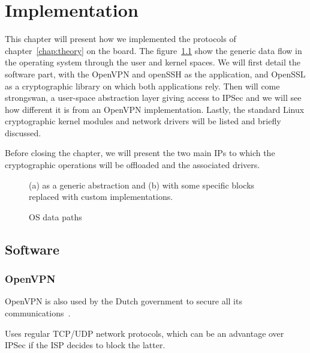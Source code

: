 \chapter{Implementation}
This chapter will present how we implemented the protocols of chapter~\ref{chap:theory} on the board.
The figure~\ref{fig:os-path-generic} show the generic data flow in the operating system through the user and kernel spaces.
We will first detail the software part, with the OpenVPN and openSSH as the application, and OpenSSL as a cryptographic library on which both applications rely.
Then will come strongswan, a user-space abstraction layer giving access to IPSec and we will see how different it is from an OpenVPN implementation.
Lastly, the standard Linux cryptographic kernel modules and network drivers will be listed and briefly discussed.

Before closing the chapter, we will present the two main IPs to which the cryptographic operations will be offloaded and the associated drivers.


\begin{figure}[ht]
\center
{}
\caption{OS data paths}{(a) as a generic abstraction and (b) with some specific blocks replaced with custom implementations.}
\label{fig:os-path-generic}
\end{figure}

\section{Software}

\subsection{OpenVPN}

OpenVPN is also used by the Dutch government to secure all its communications~\cite{openvpn-nl}.

Uses regular TCP/UDP network protocols, which can be an advantage over IPSec if the ISP decides to block the latter.

